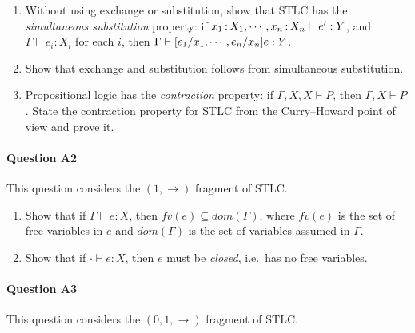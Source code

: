 \documentclass[11pt,a4paper,twoside]{article}
\begin{document}
\begin{enumerate}[label=(\alph*)]
  \item Without using exchange or substitution, show that STLC has
    the \emph{simultaneous substitution} property:
    if $x_1 \,{:}\, X_1, \cdots, x_n \,{:}\, X_n \vdash e' : Y$, and
    $\Gamma \vdash e_i : X_i$ for each $i$,
    then $\Gamma \vdash [e_1 / x_1, \cdots, e_n / x_n] e : Y$.

  \item Show that exchange and substitution follows from simultaneous
    substitution.

  \item Propositional logic has the \emph{contraction} property:
    if $\Gamma, X, X \vdash P$, then $\Gamma, X \vdash P$.
    State the contraction property for STLC from the Curry--Howard
    point of view and prove it.
\end{enumerate}

\paragraph{Question A2} This question considers the $(1, \to)$ fragment of STLC.

\begin{enumerate}[label=(\alph*)]
  \item Show that if $\Gamma \vdash e : X$, then $\mathit{fv}(e)
    \subseteq \mathit{dom}(\Gamma)$,
    where $\mathit{fv}(e)$ is the set of free variables in $e$
    and $\mathit{dom}(\Gamma)$ is the set of variables assumed in $\Gamma$.

  \item Show that if $\cdot \vdash e : X$, then $e$ must be
    \emph{closed}, i.e.~has no free variables.
\end{enumerate}

\paragraph{Question A3} This question considers the $(0, 1, \to)$
fragment of STLC.
\end{document}
